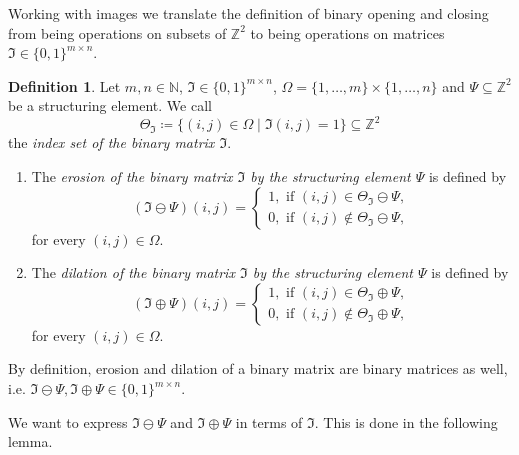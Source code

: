 \documentclass[a4paper,12pt]{article}
\theoremstyle{plain}
\theoremstyle{definition}
\newtheorem{definition}[theorem]{Definition}
\begin{document}
Working with images we translate the definition of binary opening and closing from being operations on subsets of $\mathbb{Z}^2$ to being operations on matrices $\mathfrak{I} \in \{ 0, 1 \}^{m \times n}$.

\begin{definition}
	Let $m, n \in \mathbb{N}$, $\mathfrak{I} \in \{ 0, 1 \}^{m \times n}$, $\Omega = \{ 1, \dots, m \} \times \{ 1, \dots, n \}$ and $\Psi \subseteq \mathbb{Z}^2$ be a structuring element. We call
	\begin{equation*}
		\Theta_\mathfrak{I} \coloneqq \{ (i, j) \in \Omega \mid \mathfrak{I}(i, j) = 1 \} \subseteq \mathbb{Z}^2
	\end{equation*}
	the \emph{index set of the binary matrix $\mathfrak{I}$}.
	\begin{enumerate}
		\item The \emph{erosion of the binary matrix $\mathfrak{I}$ by the structuring element $\Psi$} is defined by
		\begin{equation}
			(\mathfrak{I} \ominus \Psi)(i, j) =
			\begin{cases}
				1, \textrm{ if } (i, j) \in \Theta_\mathfrak{I} \ominus \Psi, \\
				0, \textrm{ if } (i, j) \notin \Theta_\mathfrak{I} \ominus \Psi,
			\end{cases}
		\end{equation}
		for every $(i, j) \in \Omega$.
		\item The \emph{dilation of the binary matrix $\mathfrak{I}$ by the structuring element $\Psi$} is defined by
		\begin{equation}
			(\mathfrak{I} \oplus \Psi)(i, j) =
			\begin{cases}
				1, \textrm{ if } (i, j) \in \Theta_\mathfrak{I} \oplus \Psi, \\
				0, \textrm{ if } (i, j) \notin \Theta_\mathfrak{I} \oplus \Psi,
			\end{cases}
		\end{equation}
		for every $(i, j) \in \Omega$.
	\end{enumerate}
\end{definition}

By definition, erosion and dilation of a binary matrix are binary matrices as well, i.e. $\mathfrak{I} \ominus \Psi, \mathfrak{I} \oplus \Psi \in \{ 0, 1 \}^{m \times n}$.

We want to express $\mathfrak{I} \ominus \Psi$ and $\mathfrak{I} \oplus \Psi$ in terms of $\mathfrak{I}$. This is done in the following lemma.
\end{document}
